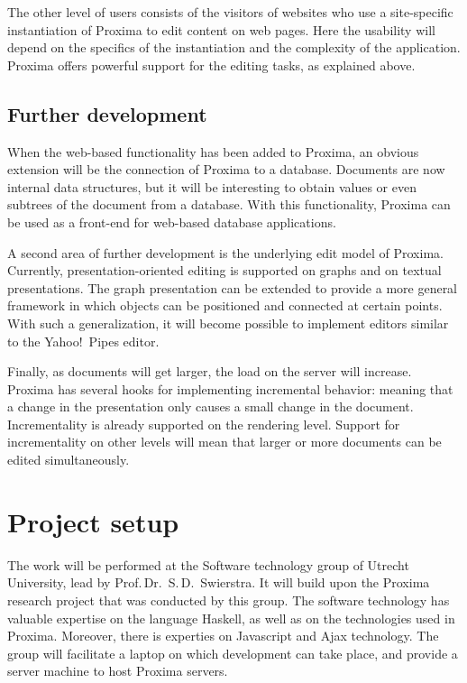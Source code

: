 \documentclass[10pt]{article}
\begin{document}
The other level of users consists of the visitors of websites who use a site-specific instantiation of Proxima to edit content on web pages. Here the usability will depend on the specifics of the instantiation and the complexity of the application. Proxima offers powerful support for the editing tasks, as explained above.



\subsection{Further development}


When the web-based functionality has been added to Proxima, an obvious extension will be the connection of Proxima to a database. Documents are now internal data structures, but it will be interesting to obtain values or even subtrees of the document from a database. With this functionality, Proxima can be used as a front-end for web-based database applications.

A second area of further development is the underlying edit model of Proxima. Currently, presentation-oriented editing is supported on graphs and on textual presentations. The graph presentation can be extended to provide a more general framework in which objects can be positioned and connected at certain points. With such a generalization, it will become possible to implement editors similar to the Yahoo!\ Pipes editor.

Finally, as documents will get larger, the load on the server will increase. Proxima has several hooks for implementing incremental behavior: meaning that a change in the presentation only causes a small change in the document. Incrementality is already supported on the rendering level. Support for incrementality on other levels will mean that larger or more documents can be edited simultaneously.


\section{Project setup}

The work will be performed at the Software technology group of Utrecht University, lead by Prof.\,Dr.~S.\,D.~Swierstra. It will build upon the Proxima research project that was conducted by this group. The software technology has valuable expertise on the language Haskell, as well as on the technologies used in Proxima. Moreover, there is experties on Javascript and Ajax technology. The group will facilitate a laptop on which development can take place, and provide a server machine to host Proxima servers.
\end{document}
